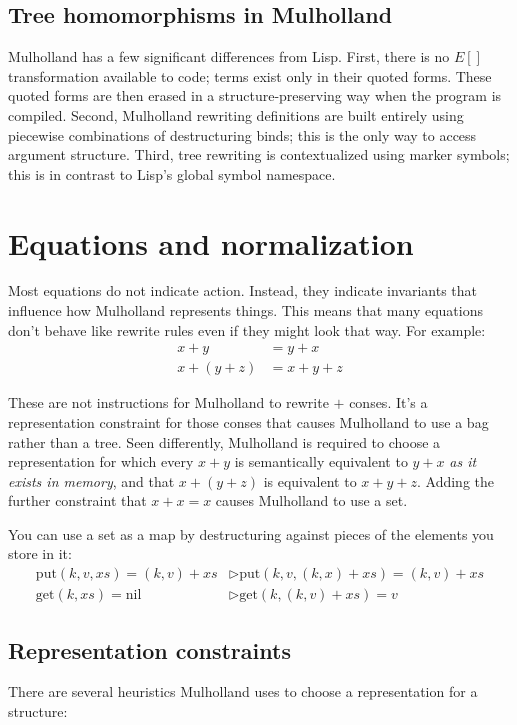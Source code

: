 \documentclass{report}
\begin{document}
\section{Tree homomorphisms in Mulholland}
    Mulholland has a few significant differences from Lisp. First, there is no $E[]$ transformation available to code; terms exist only in their quoted forms. These quoted forms are then
    erased in a structure-preserving way when the program is compiled. Second, Mulholland rewriting definitions are built entirely using piecewise combinations of destructuring binds; this is
    the only way to access argument structure. Third, tree rewriting is contextualized using marker symbols; this is in contrast to Lisp's global symbol namespace.


\chapter{Equations and normalization}
  Most equations do not indicate action. Instead, they indicate invariants that influence how Mulholland represents things. This means that many equations don't behave like rewrite rules even
  if they might look that way. For example:
\begin{align*}
x + y       & = y + x \\
x + (y + z) & = x + y + z
\end{align*}

  These are not instructions for Mulholland to rewrite $+$ conses. It's a representation constraint for those conses that causes Mulholland to use a bag rather than a tree. Seen differently,
  Mulholland is required to choose a representation for which every $x + y$ is semantically equivalent to $y + x$ {\em as it exists in memory}, and that $x + (y + z)$ is equivalent to $x + y +
  z$. Adding the further constraint that $x + x = x$ causes Mulholland to use a set.

  You can use a set as a map by destructuring against pieces of the elements you store in it:
\begin{align*}
\textrm{put}(k, v, xs) = (k, v) + xs  & \rhd \textrm{put}(k, v, (k, x) + xs) = (k, v) + xs \\
\textrm{get}(k, xs)    = \textrm{nil} & \rhd \textrm{get}(k, (k, v) + xs)    = v
\end{align*}

\section{Representation constraints}
    There are several heuristics Mulholland uses to choose a representation for a structure:
\end{document}
